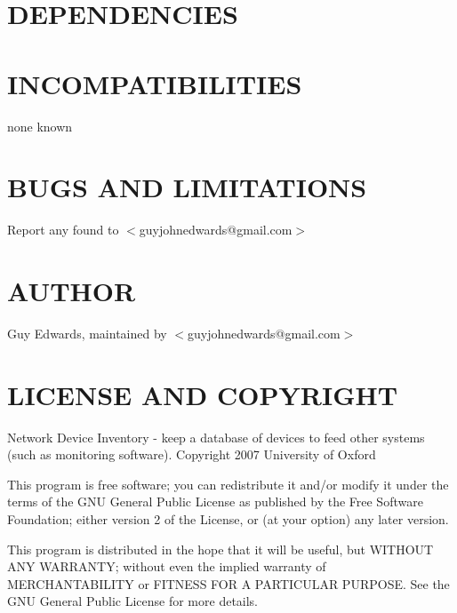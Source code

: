 \documentclass{book}
\begin{document}
\section{DEPENDENCIES}
\label{_DEPENDENCIES}
\hypertarget{_DEPENDENCIES}{}


\section{INCOMPATIBILITIES}
\label{_INCOMPATIBILITIES}
\hypertarget{_INCOMPATIBILITIES}{}



none known


\section{BUGS AND LIMITATIONS}
\label{_BUGS_AND_LIMITATIONS}
\hypertarget{_BUGS_AND_LIMITATIONS}{}



Report any found to $<$guyjohnedwards@gmail.com$>$


\section{AUTHOR}
\label{_AUTHOR}
\hypertarget{_AUTHOR}{}



Guy Edwards, maintained by $<$guyjohnedwards@gmail.com$>$


\section{LICENSE AND COPYRIGHT}
\label{_LICENSE_AND_COPYRIGHT}
\hypertarget{_LICENSE_AND_COPYRIGHT}{}



Network Device Inventory - keep a database of devices to feed other systems (such as monitoring software). Copyright 2007 University of Oxford



This program is free software; you can redistribute it and/or modify it under the terms of the GNU General Public License as published by the Free Software Foundation; either version 2 of the License, or (at your option) any later version.



This program is distributed in the hope that it will be useful, but WITHOUT ANY WARRANTY; without even the implied warranty of MERCHANTABILITY or FITNESS FOR A PARTICULAR PURPOSE. See the GNU General Public License for more details.
\end{document}
